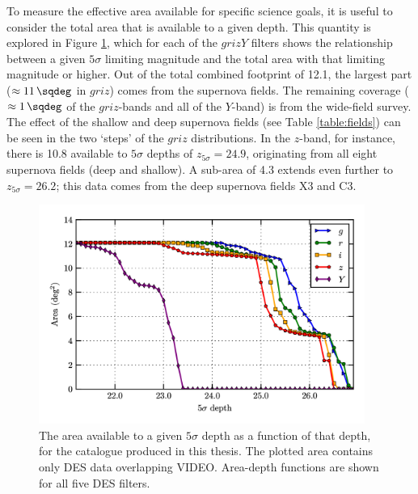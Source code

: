 To measure the effective area available for specific science goals, it is useful to consider the total \DESVIDEO area that is available to a given depth. This quantity is explored in Figure \ref{fig:area_depth}, which for each of the $grizY$ filters shows the relationship between a given $5\sigma$ limiting magnitude and the total area with that limiting magnitude or higher. Out of the total combined footprint of \SI{12.1}{\sqdeg}, the largest part ($\approx\SI{11}{\sqdeg}$ in $griz$) comes from the supernova fields. The remaining coverage ($\approx\SI{1}{\sqdeg}$ of the $griz$-bands and all of the $Y$-band) is from the wide-field survey. The effect of the shallow and deep supernova fields (see Table \ref{table:fields}) can be seen in the two `steps' of the $griz$ distributions. In the $z$-band, for instance, there is \SI{10.8}{\sqdeg} available to $5\sigma$ depths of $z_{5\sigma}=24.9$, originating from all eight supernova fields (deep and shallow). A sub-area of \SI{4.3}{\sqdeg} extends even further to $z_{5\sigma}=26.2$; this data comes from the deep supernova fields X3 and C3. \par

\begin{figure}[!htb] 
\centering    
\includegraphics[width=0.95\textwidth]{area_depth_plot_5sig.png}
\caption[Area as a function of \texorpdfstring{$5\sigma$}{} depth for the total survey footprint]{The area available to a given $5\sigma$ depth as a function of that depth, for the catalogue produced in this thesis. The plotted area contains only DES data overlapping VIDEO. Area-depth functions are shown for all five DES filters.}
\label{fig:area_depth}
\end{figure}

